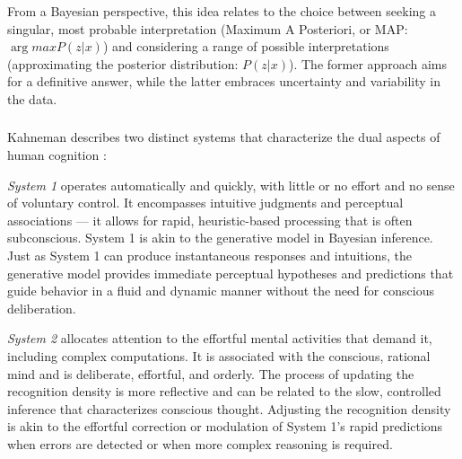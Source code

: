 
From a Bayesian perspective, this idea relates to the choice between seeking a singular, most probable interpretation (Maximum A Posteriori, or MAP: $\arg max P(z|x)$) and considering a range of possible interpretations (approximating the posterior distribution: $P(z|x)$). The former approach aims for a definitive answer, while the latter embraces uncertainty and variability in the data.

\subsubsection{}
Kahneman describes two distinct systems that characterize the dual aspects of human cognition \cite{Kahneman11}:

\emph{System 1} operates automatically and quickly, with little or no effort and no sense of voluntary control. It encompasses intuitive judgments and perceptual associations — it allows for rapid, heuristic-based processing that is often subconscious.
System 1 is akin to the generative model in Bayesian inference. Just as System 1 can produce instantaneous responses and intuitions, the generative model provides immediate perceptual hypotheses and predictions that guide behavior in a fluid and dynamic manner without the need for conscious deliberation.

\emph{System 2} allocates attention to the effortful mental activities that demand it, including complex computations. It is associated with the conscious, rational mind and is deliberate, effortful, and orderly. 
The process of updating the recognition density is more reflective and can be related to the slow, controlled inference that characterizes conscious thought. Adjusting the recognition density is akin to the effortful correction or modulation of System 1's rapid predictions when errors are detected or when more complex reasoning is required.


